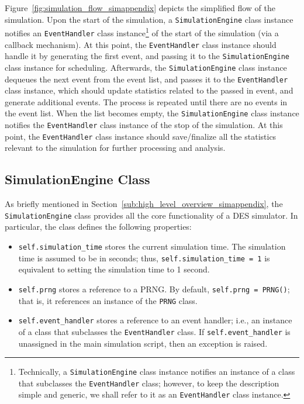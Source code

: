 Figure~\ref{fig:simulation_flow_simappendix} depicts the simplified flow of the simulation. Upon the start of the simulation, a \lstinline{SimulationEngine} class instance notifies an \lstinline{EventHandler} class instance\footnote{Technically, a \lstinline{SimulationEngine} class instance notifies an instance of a class that subclasses the \lstinline{EventHandler} class; however, to keep the description simple and generic, we shall refer to it as an \lstinline{EventHandler} class instance.} of the start of the simulation (via a callback mechanism). At this point, the \lstinline{EventHandler} class instance should handle it by generating the first event, and passing it to the \lstinline{SimulationEngine} class instance for scheduling. Afterwards, the \lstinline{SimulationEngine} class instance dequeues the next event from the event list, and passes it to the \lstinline{EventHandler} class instance, which should update statistics related to the passed in event, and generate additional events. The process is repeated until there are no events in the event list. When the list becomes empty, the \lstinline{SimulationEngine} class instance notifies the \lstinline{EventHandler} class instance of the stop of the simulation. At this point, the \lstinline{EventHandler} class instance should save/finalize all the statistics relevant to the simulation for further processing and analysis.

\subsection{SimulationEngine Class}
\label{sub:simulationengine_class_simappendix}
As briefly mentioned in Section~\ref{sub:high_level_overview_simappendix}, the \lstinline{SimulationEngine} class provides all the core functionality of a DES simulator. In particular, the class defines the following properties:
\begin{itemize}
  \item \lstinline{self.simulation_time} stores the current simulation time. The simulation time is assumed to be in seconds; thus, \lstinline{self.simulation_time = 1} is equivalent to setting the simulation time to 1 second.
  \item \lstinline{self.prng} stores a reference to a PRNG. By default, \lstinline{self.prng = PRNG()}; that is, it references an instance of the \lstinline{PRNG} class.
  \item \lstinline{self.event_handler} stores a reference to an event handler; i.e., an instance of a class that subclasses the \lstinline{EventHandler} class. If \lstinline{self.event_handler} is unassigned in the main simulation script, then an exception is raised.
\end{itemize}


